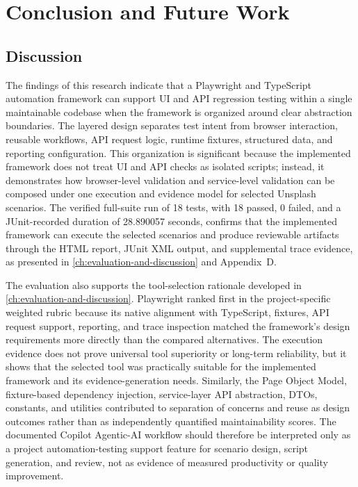 \chapter{Conclusion and Future Work}
\label{ch:conclusion-and-future-work}
\begingroup
\sloppy
\setlength{\emergencystretch}{3em}

\section{Discussion}
\label{sec:ch6-discussion}

The findings of this research indicate that a Playwright and TypeScript automation framework can support UI and API regression testing within a single maintainable codebase when the framework is organized around clear abstraction boundaries. The layered design separates test intent from browser interaction, reusable workflows, API request logic, runtime fixtures, structured data, and reporting configuration. This organization is significant because the implemented framework does not treat UI and API checks as isolated scripts; instead, it demonstrates how browser-level validation and service-level validation can be composed under one execution and evidence model for selected Unsplash scenarios. The verified full-suite run of 18 tests, with 18 passed, 0 failed, and a JUnit-recorded duration of 28.890057 seconds, confirms that the implemented framework can execute the selected scenarios and produce reviewable artifacts through the HTML report, JUnit XML output, and supplemental trace evidence, as presented in \cref{ch:evaluation-and-discussion} and Appendix~D.

The evaluation also supports the tool-selection rationale developed in \cref{ch:evaluation-and-discussion}. Playwright ranked first in the project-specific weighted rubric because its native alignment with TypeScript, fixtures, API request support, reporting, and trace inspection matched the framework's design requirements more directly than the compared alternatives. The execution evidence does not prove universal tool superiority or long-term reliability, but it shows that the selected tool was practically suitable for the implemented framework and its evidence-generation needs. Similarly, the Page Object Model, fixture-based dependency injection, service-layer API abstraction, DTOs, constants, and utilities contributed to separation of concerns and reuse as design outcomes rather than as independently quantified maintainability scores. The documented Copilot Agentic-AI workflow should therefore be interpreted only as a project automation-testing support feature for scenario design, script generation, and review, not as evidence of measured productivity or quality improvement.

